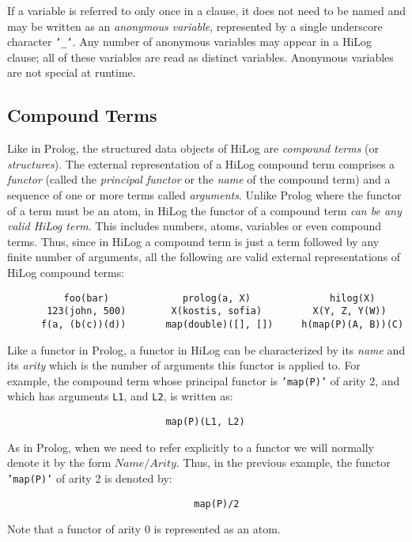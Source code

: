 If a variable is referred to only once in a clause, it does not need to be
named and may be written as an {\em anonymous variable}, represented by a
single underscore character {\tt '\_'}.  Any number of anonymous variables
may appear in a HiLog clause; all of these variables are read as distinct
variables.  Anonymous variables are not special at runtime.


\subsection{Compound Terms}
Like in Prolog, the structured data objects of HiLog are {\em compound terms}
(or {\em structures}).  The external representation of a HiLog compound term
comprises a {\em functor} (called the {\em principal functor} or the
{\em name} of the compound term) and a sequence of one or more terms called
{\em arguments}.  Unlike Prolog where the functor of a term must be an atom,
in HiLog the functor of a compound term {\em can be any valid HiLog term}.
This includes numbers, atoms, variables or even compound terms.  Thus, since
in HiLog a compound term is just a term followed by any finite number of
arguments, all the following are valid external representations of HiLog
compound terms: 
\label{some_compound_terms}
\begin{verbatim}
          foo(bar)             prolog(a, X)              hilog(X)       
       123(john, 500)        X(kostis, sofia)         X(Y, Z, Y(W))   
      f(a, (b(c))(d))       map(double)([], [])     h(map(P)(A, B))(C)
\end{verbatim}

Like a functor in Prolog, a functor in HiLog can be characterized by
its {\em name} and its {\em arity} which is the number of arguments this
functor is applied to.  For example, the compound term whose principal functor
is {\tt 'map(P)'} of arity 2, and which has arguments {\tt L1}, and {\tt L2},
is written as:
\begin{verbatim}
                            map(P)(L1, L2)
\end{verbatim}

As in Prolog, when we need to refer explicitly to a functor we will normally
denote it by the form $Name/Arity$.  Thus, in the previous example, the functor
{\tt 'map(P)'} of arity 2 is denoted by:
\begin{verbatim}
                                 map(P)/2
\end{verbatim}
Note that a functor of arity 0 is represented as an atom.

